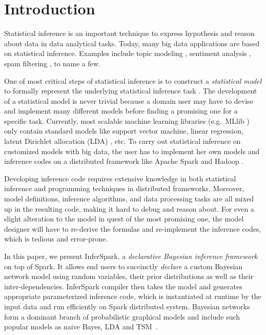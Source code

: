 
\section{Introduction}
\label{sec:intro}


Statistical inference is an important technique to express hypothesis and
reason about data in data analytical tasks.  Today, many big data applications
are based on statistical inference. Examples include topic modeling
\cite{blei2003latent,Titov2008a}, sentiment analysis \cite{Titov2008b,
Jo2011,tsm}, spam filtering \cite{spam}, to name a few.


One of most critical steps of statistical inference is to construct a
\emph{statistical model} to formally represent the underlying statistical
inference task \cite{cox}. The development of a statistical
model is never trivial because a domain user may have to devise and
implement many  different models before finding a promising one for a specific
task.  Currently, most scalable machine learning libraries (e.g.~MLlib \cite{mllib}) only
contain standard models like support vector machine, linear regression, latent
Dirichlet allocation (LDA) \cite{blei2003latent}, etc.  
To carry out statistical inference on
customized models with big data, the user has to implement her own models and
inference codes on a distributed framework like Apache Spark
\cite{Zaharia:2010:SCC:1863103.1863113} and Hadoop \cite{hadoop}.

Developing inference code requires extensive knowledge in both statistical
inference and programming techniques in distributed frameworks.  Moreover,
model definitions, inference algorithms, and data processing tasks are all
mixed up in the resulting code, making it hard to debug and reason about.  For
even a slight alteration to the model in quest of the most promising one, the
model designer will have to re-derive the formulas and re-implement the
inference codes, which is tedious and error-prone. 

In this paper, we present InferSpark, a \emph{declarative Bayesian inference
framework} on top of Spark. It allows end users to succinctly {\em declare} a
 custom Bayesian network model using random variables, 
their prior distributions as well as
their inter-dependencies. InferSpark compiler then takes the model and generates
appropriate parameterized inference code, which is instantiated at runtime
by the input data and run efficiently on Spark distributed system.
Bayesian networks form a dominant branch of probabilistic graphical models
and include such popular models as naive Bayes, LDA and TSM~\cite{tsm}.

